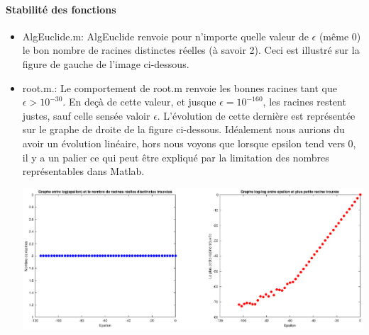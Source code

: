 \documentclass[11pt]{article}
\begin{document}
\paragraph{Stabilité des fonctions}

\begin{itemize}
\item [\textbullet] AlgEuclide.m:
AlgEuclide renvoie pour n'importe quelle valeur de $\epsilon$ (même 0) le bon nombre de racines distinctes réelles (à savoir 2). Ceci est illustré sur la figure de gauche
de l'image ci-dessous.
    \item [\textbullet] root.m.:
        Le comportement de root.m renvoie les bonnes racines tant que $\epsilon > 10^{-30}$. En deçà de cette valeur, et jusque $\epsilon = 10^{-160}$, les racines restent justes, sauf celle sensée valoir $\epsilon$. L'évolution de cette dernière
        est représentée sur le graphe de droite de la figure ci-dessous. Idéalement nous aurions du avoir un évolution linéaire, hors nous voyons que lorsque epsilon tend vers 0, il y a un palier
        ce qui peut être expliqué par la limitation des nombres représentables dans Matlab.

        \begin{center}
          \includegraphics[width=15cm]{image/stab}
        \end{center}

\end{itemize}
\end{document}
